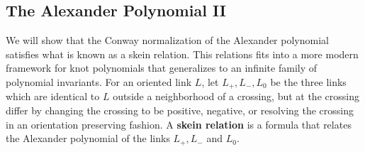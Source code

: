 \subsection{The Alexander Polynomial II}
\label{The Alexander Polynomial II}

We will show that the Conway normalization of the Alexander polynomial satisfies what is known as a skein relation. This relations fits into a more modern framework for knot polynomials that generalizes to an infinite family of polynomial invariants. For an oriented link $L$, let $L_+,L_-,L_0$ be the three links which are identical to $L$ outside a neighborhood of a crossing, but at the crossing differ by changing the crossing to be positive, negative, or resolving the crossing in an orientation preserving fashion. A \textbf{skein relation} is a formula that relates the Alexander polynomial of the links $L_+,L_-$ and $L_0$.

